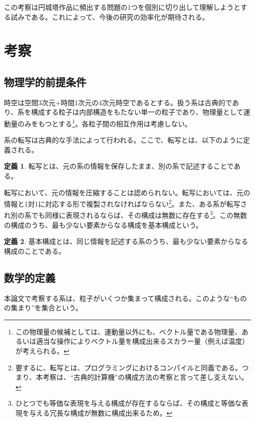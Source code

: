 \documentclass[10pt, a5paper, twoside]{jsarticle}
\theoremstyle{definition}
\newtheorem{dfn}{定義}
\begin{document}
		この考察は円城塔作品に頻出する問題の1つを個別に切り出して理解しようとする試みである。これによって、今後の研究の効率化が期待される。

	\section{考察}

		\subsection{物理学的前提条件}

			時空は空間3次元$+$時間1次元の4次元時空であるとする。扱う系は古典的であり、系を構成する粒子は内部構造をもたない単一の粒子であり、物理量として運動量のみをもつとする\footnote{この物理量の候補としては、運動量以外にも、ベクトル量である物理量、あるいは適当な操作によりベクトル量を構成出来るスカラー量（例えば温度）が考えられる。}。各粒子間の相互作用は考慮しない。

			系の転写は古典的な手法によって行われる。ここで、転写とは、以下のように定義される。

			\begin{dfn}
			
				転写とは、元の系の情報を保存したまま、別の系で記述することである。
			
			\end{dfn}

			転写において、元の情報を圧縮することは認められない。転写においては、元の情報と1対1に対応する形で複製されなければならない\footnote{要するに、転写とは、プログラミングにおけるコンパイルと同義である。つまり、本考察は、“古典的計算機”の構成方法の考察と言って差し支えない。}。また、ある系が転写され別の系でも同様に表現されるならば、その構成は無数に存在する\footnote{ひとつでも等価な表現を与える構成が存在するならば、その構成と等価な表現を与える冗長な構成が無数に構成出来るため。}。この無数の構成のうち、最も少ない要素からなる構成を基本構成という。

			\begin{dfn}

				基本構成とは、同じ情報を記述する系のうち、最も少ない要素からなる構成のことである。
			
			\end{dfn}

		\subsection{数学的定義}

			本論文で考察する系は、粒子がいくつか集まって構成される。このような“ものの集まり”を集合という。
\end{document}
